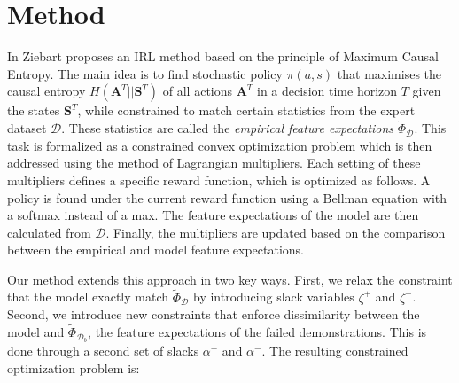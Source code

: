 \documentclass[conference]{IEEEtran}
\begin{document}
\section{Method}
In \cite{ziebart2010modelingthesis} Ziebart proposes an IRL method based on the principle of Maximum Causal Entropy.  The main idea is to find stochastic policy $\pi(a,s)$ that maximises the causal entropy $H(\mathbf{A}^T||\mathbf{S}^T)$ of all actions $\mathbf{A}^T$ in a decision time horizon $T$ given the states $\mathbf{S}^T$, while constrained to match certain statistics from the expert dataset $\mathcal{D}$. These statistics are called the \emph{empirical feature expectations} $\widetilde{\Phi}_{\mathcal{D}}$. This task is formalized as a constrained convex optimization problem which is then addressed using the method of Lagrangian multipliers.  
%
Each setting of these multipliers defines a specific reward function, which is optimized as follows. A policy is found under the current reward function using a Bellman equation with a softmax instead of a max.  The feature expectations of the model are then calculated from $\mathcal{D}$. Finally, the multipliers are updated based on the comparison between the empirical and model feature expectations.

Our method extends this approach in two key ways.  First, we relax the constraint that the model  exactly match $\widetilde{\Phi}_{\mathcal{D}}$ by introducing slack variables $\zeta^+$ and $\zeta^-$.  Second, we introduce new constraints that enforce dissimilarity between the model and $\widetilde{\Phi}_{\mathcal{D}_b}$, the feature expectations of the failed demonstrations. This is done through a second set of slacks $\alpha^+$ and $\alpha^-$. The resulting constrained optimization problem is:
	
\end{document}
